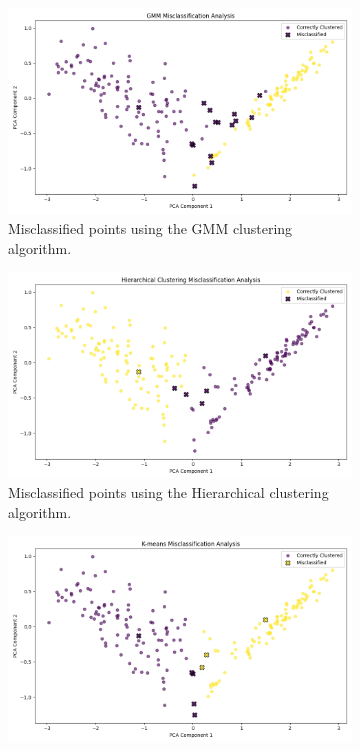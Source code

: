 \documentclass[a4paper,12pt]{report}
\begin{document}
\begin{figure}[H]
    \centering
    \begin{subfigure}[b]{0.8\textwidth}
        \includegraphics[width=\textwidth]{images/clustering/gmm_misclassifications.png}
        \caption{Misclassified points using the GMM clustering algorithm.}
    \end{subfigure}
    \vspace{0.5cm}
    \begin{subfigure}[b]{0.8\textwidth}
        \includegraphics[width=\textwidth]{images/clustering/hierarchical_misclassifications.png}
        \caption{Misclassified points using the Hierarchical clustering algorithm.}
    \end{subfigure}
    \vspace{0.5cm}
    \begin{subfigure}[b]{0.8\textwidth}
        \includegraphics[width=\textwidth]{images/clustering/kmeans_misclassifications.png}

\end{subfigure}
\end{figure}
\end{document}
